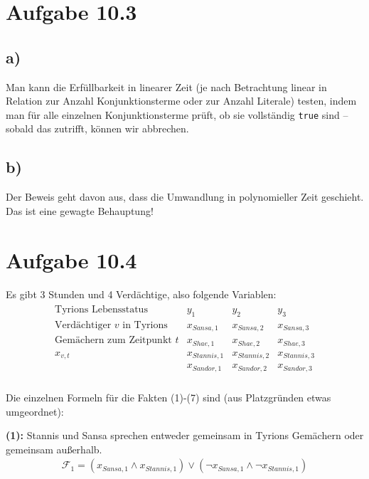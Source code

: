 \documentclass{article}
\begin{document}
\section*{Aufgabe 10.3}
\subsection*{a)}
Man kann die Erfüllbarkeit in linearer Zeit (je nach Betrachtung linear in Relation zur Anzahl Konjunktionsterme oder zur Anzahl Literale) testen, indem man für alle einzelnen Konjunktionsterme prüft, ob sie vollständig \texttt{true} sind -- sobald das zutrifft, können wir abbrechen.

\subsection*{b)}
Der Beweis geht davon aus, dass die Umwandlung in polynomieller Zeit geschieht. Das ist eine gewagte Behauptung!



\section*{Aufgabe 10.4}
Es gibt 3 Stunden und 4 Verdächtige, also folgende Variablen:
\begin{align*}
\begin{array}{l|lll}
\text{Tyrions Lebensstatus} & y_1 & y_2 & y_3 \\
\hline
\text{Verdächtiger $v$ in Tyrions} & x_{Sansa,1} & x_{Sansa,2} & x_{Sansa,3} \\ 
\text{Gemächern zum Zeitpunkt $t$} & x_{Shae,1} & x_{Shae,2} & x_{Shae,3} \\
x_{v,t}                            & x_{Stannis,1} & x_{Stannis,2} & x_{Stannis,3} \\
                                   & x_{Sandor,1} & x_{Sandor,2} & x_{Sandor,3} \\
\end{array}
\end{align*}

Die einzelnen Formeln für die Fakten (1)-(7) sind (aus Platzgründen etwas umgeordnet):

\smallskip

\textbf{(1): }Stannis und Sansa sprechen entweder gemeinsam in Tyrions Gemächern oder gemeinsam außerhalb.
\begin{align*}
\mathcal{F}_{1}=(x_{Sansa,1} \wedge x_{Stannis,1}) \vee (\neg x_{Sansa,1} \wedge \neg x_{Stannis,1})
\end{align*}
\end{document}
